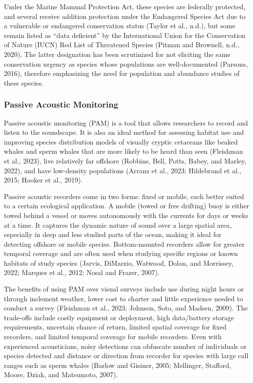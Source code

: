 \documentclass[
]{article}
\begin{document}
Under the Marine Mammal Protection Act, these species are federally
protected, and several receive addition protection under the Endangered
Species Act due to a vulnerable or endangered conservation status
(Taylor et al., n.d.), but some remain listed as ``data deficient'' by
the International Union for the Conservation of Nature (IUCN) Red List
of Threatened Species (Pitman and Brownell, n.d., 2020). The latter
designation has been scrutinized for not eliciting the same conservation
urgency as species whose populations are well-documented (Parsons,
2016), therefore emphasizing the need for population and abundance
studies of these species.

\hypertarget{passive-acoustic-monitoring}{%
\subsubsection{Passive Acoustic
Monitoring}\label{passive-acoustic-monitoring}}

Passive acoustic monitoring (PAM) is a tool that allows researchers to
record and listen to the soundscape. It is also an ideal method for
assessing habitat use and improving species distribution models of
visually cryptic cetaceans like beaked whales and sperm whales that are
more likely to be heard than seen (Fleishman et al., 2023), live
relatively far offshore (Robbins, Bell, Potts, Babey, and Marley, 2022),
and have low-density populations (Arranz et al., 2023; Hildebrand et
al., 2015; Hooker et al., 2019).

Passive acoustic recorders come in two forms: fixed or mobile, each
better suited to a certain ecological application. A mobile (towed or
free drifting) buoy is either towed behind a vessel or moves
autonomously with the currents for days or weeks at a time. It captures
the dynamic nature of sound over a large spatial area, especially in
deep and less studied parts of the ocean, making it ideal for detecting
offshore or mobile species. Bottom-mounted recorders allow for greater
temporal coverage and are often used when studying specific regions or
known habitats of study species (Jarvis, DiMarzio, Watwood, Dolan, and
Morrissey, 2022; Marques et al., 2012; Nosal and Frazer, 2007).

The benefits of using PAM over visual surveys include use during night
hours or through inclement weather, lower cost to charter and little
experience needed to conduct a survey (Fleishman et al., 2023; Johnson,
Soto, and Madsen, 2009). The trade-offs include costly equipment or
deployment, high data/battery storage requirements, uncertain chance of
return, limited spatial coverage for fixed recorders, and limited
temporal coverage for mobile recorders. Even with experienced
acousticians, noisy detections can obfuscate number of individuals or
species detected and distance or direction from recorder for species
with large call ranges such as sperm whales (Barlow and Gisiner, 2005;
Mellinger, Stafford, Moore, Dziak, and Matsumoto, 2007).
\end{document}
